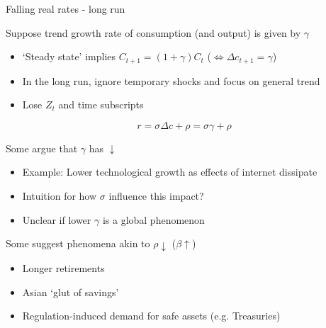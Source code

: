 \begin{frame}{Falling real rates - long run}

Suppose trend growth rate of consumption (and output) is given by $\gamma$
\begin{itemize}
\item	`Steady state' implies $C_{t+1}=(1+\gamma)C_{t}$ \;($\Leftrightarrow \Delta c_{t+1}=\gamma$)
\item	In the long run, ignore temporary shocks and focus on general trend
\item	Lose $Z_{t}$ and time subscripts
\end{itemize}
\begin{equation*}
r 	= \sigma \Delta c + \rho = \sigma \gamma + \rho
\end{equation*}

Some argue that $\gamma$ has $\downarrow$
\begin{itemize}
\item	Example: Lower technological growth as effects of internet dissipate
\item	Intuition for how $\sigma$ influence this impact?
\item	Unclear if lower $\gamma$ is a global phenomenon
\end{itemize}

\vspace{2mm}
Some suggest phenomena akin to $\rho\downarrow$ ($\beta\uparrow$)
\begin{itemize}
\item	Longer retirements
\item	Asian `glut of savings'
\item	Regulation-induced demand for safe assets (e.g. Treasuries)
\end{itemize}

\end{frame}


	

